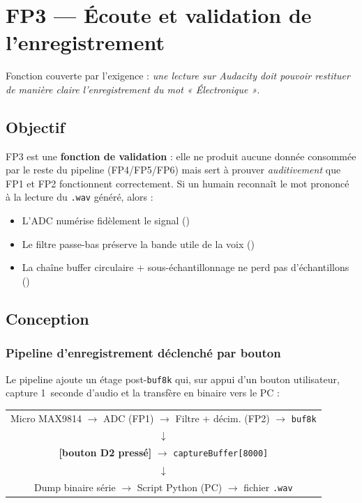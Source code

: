 \section{FP3 --- Écoute et validation de l'enregistrement}
\label{sec:fp3}

Fonction couverte par l'exigence  : \emph{une lecture sur Audacity doit pouvoir restituer de manière claire l'enregistrement du mot « Électronique »}.
\subsection{Objectif}

FP3 est une \textbf{fonction de validation} : elle ne produit aucune donnée consommée par le reste du pipeline (FP4/FP5/FP6) mais sert à prouver \emph{auditivement} que FP1 et FP2 fonctionnent correctement. Si un humain reconnaît le mot prononcé à la lecture du \texttt{.wav} généré, alors :
\begin{itemize}
    \item L'ADC numérise fidèlement le signal ()
    \item Le filtre passe-bas préserve la bande utile de la voix ()
    \item La chaîne buffer circulaire + sous-échantillonnage ne perd pas d'échantillons ()
\end{itemize}

\subsection{Conception}

\subsubsection{Pipeline d'enregistrement déclenché par bouton}

Le pipeline ajoute un étage post-\texttt{buf8k} qui, sur appui d'un bouton utilisateur, capture 1~seconde d'audio et la transfère en binaire vers le PC :

\begin{center}
\begin{tabular}{c}
Micro MAX9814 $\rightarrow$ ADC (FP1) $\rightarrow$ Filtre + décim. (FP2) $\rightarrow$ \texttt{buf8k} \\
$\downarrow$ \\
\textbf{[bouton D2 pressé]} $\rightarrow$ \texttt{captureBuffer[8000]} \\
$\downarrow$ \\
Dump binaire série $\rightarrow$ Script Python (PC) $\rightarrow$ fichier \texttt{.wav}
\end{tabular}
\end{center}

